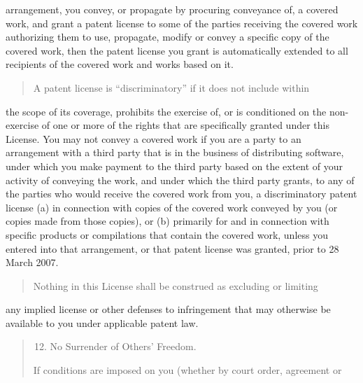 \documentclass[letterpaper,10pt,english]{sphinxmanual}
\begin{document}
arrangement, you convey, or propagate by procuring conveyance of, a
covered work, and grant a patent license to some of the parties
receiving the covered work authorizing them to use, propagate, modify
or convey a specific copy of the covered work, then the patent license
you grant is automatically extended to all recipients of the covered
work and works based on it.
\begin{quote}

A patent license is “discriminatory” if it does not include within
\end{quote}

the scope of its coverage, prohibits the exercise of, or is
conditioned on the non-exercise of one or more of the rights that are
specifically granted under this License.  You may not convey a covered
work if you are a party to an arrangement with a third party that is
in the business of distributing software, under which you make payment
to the third party based on the extent of your activity of conveying
the work, and under which the third party grants, to any of the
parties who would receive the covered work from you, a discriminatory
patent license (a) in connection with copies of the covered work
conveyed by you (or copies made from those copies), or (b) primarily
for and in connection with specific products or compilations that
contain the covered work, unless you entered into that arrangement,
or that patent license was granted, prior to 28 March 2007.
\begin{quote}

Nothing in this License shall be construed as excluding or limiting
\end{quote}

any implied license or other defenses to infringement that may
otherwise be available to you under applicable patent law.
\begin{quote}
\begin{enumerate}
\setcounter{enumi}{11}
\item {} 
No Surrender of Others’ Freedom.

\end{enumerate}

If conditions are imposed on you (whether by court order, agreement or
\end{quote}
\end{document}

